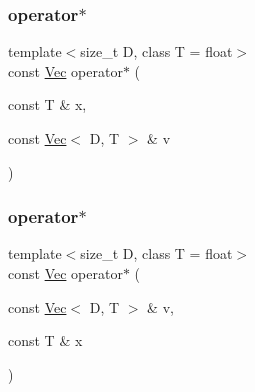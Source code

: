 \mbox{\label{classtrimesh_1_1Vec_abf00d36d09c57aa39e823eb8055c0ae4}} 
\subsubsection{\texorpdfstring{operator$\ast$}{operator*}\hspace{0.1cm}{\footnotesize\ttfamily [1/2]}}
{\footnotesize\ttfamily template$<$size\+\_\+t D, class T = float$>$ \\
const \hyperlink{classtrimesh_1_1Vec}{Vec} operator$\ast$ (\begin{DoxyParamCaption}\item[{const T \&}]{x,  }\item[{const \hyperlink{classtrimesh_1_1Vec}{Vec}$<$ D, T $>$ \&}]{v }\end{DoxyParamCaption})\hspace{0.3cm}{\ttfamily [friend]}}

\mbox{\label{classtrimesh_1_1Vec_adf4c943b26d721efc55eda5d6a6965fc}} 
\subsubsection{\texorpdfstring{operator$\ast$}{operator*}\hspace{0.1cm}{\footnotesize\ttfamily [2/2]}}
{\footnotesize\ttfamily template$<$size\+\_\+t D, class T = float$>$ \\
const \hyperlink{classtrimesh_1_1Vec}{Vec} operator$\ast$ (\begin{DoxyParamCaption}\item[{const \hyperlink{classtrimesh_1_1Vec}{Vec}$<$ D, T $>$ \&}]{v,  }\item[{const T \&}]{x }\end{DoxyParamCaption})\hspace{0.3cm}{\ttfamily [friend]}}

\mbox{\label{classtrimesh_1_1Vec_a06b28f1d6643355f8a25c910a3f303c4}} 
